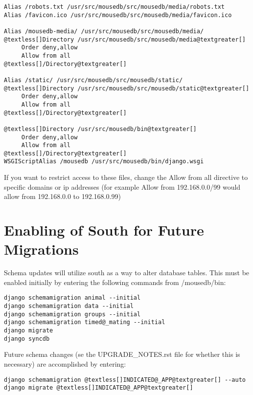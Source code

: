 \documentclass[letterpaper,10pt,english]{sphinxmanual}
\begin{document}
\begin{Verbatim}[commandchars=@\[\]]
Alias /robots.txt /usr/src/mousedb/src/mousedb/media/robots.txt
Alias /favicon.ico /usr/src/mousedb/src/mousedb/media/favicon.ico

Alias /mousedb-media/ /usr/src/mousedb/src/mousedb/media/
@textless[]Directory /usr/src/mousedb/src/mousedb/media@textgreater[]
     Order deny,allow
     Allow from all
@textless[]/Directory@textgreater[]

Alias /static/ /usr/src/mousedb/src/mousedb/static/
@textless[]Directory /usr/src/mousedb/src/mousedb/static@textgreater[]
     Order deny,allow
     Allow from all
@textless[]/Directory@textgreater[]

@textless[]Directory /usr/src/mousedb/bin@textgreater[]
     Order deny,allow
     Allow from all
@textless[]/Directory@textgreater[]
WSGIScriptAlias /mousedb /usr/src/mousedb/bin/django.wsgi
\end{Verbatim}

If you want to restrict access to these files, change the Allow from all directive to specific domains or ip addresses (for example Allow from 192.168.0.0/99 would allow from 192.168.0.0 to 192.168.0.99)


\section{Enabling of South for Future Migrations}
\label{installation:enabling-of-south-for-future-migrations}
Schema updates will utilize south as a way to alter database tables.  This must be enabled initially by entering the following commands from /mousedb/bin:

\begin{Verbatim}[commandchars=@\[\]]
django schemamigration animal --initial
django schemamigration data --initial
django schemamigration groups --initial
django schemamigration timed@_mating --initial
django migrate
django syncdb
\end{Verbatim}

Future schema changes (se the UPGRADE\_NOTES.rst file for whether this is necessary) are accomplished by entering:

\begin{Verbatim}[commandchars=@\[\]]
django schemamigration @textless[]INDICATED@_APP@textgreater[] --auto
django migrate @textless[]INDICATED@_APP@textgreater[]
\end{Verbatim}
\end{document}
